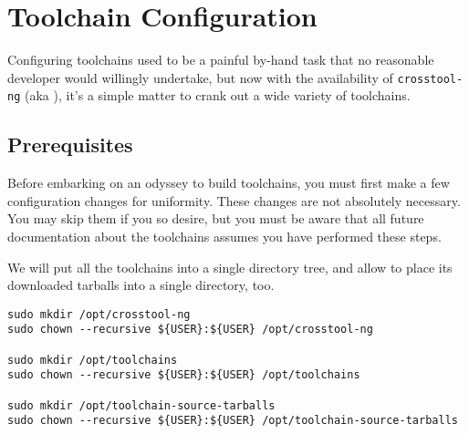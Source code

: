 %
%
%
%
\chapter{Toolchain Configuration}\label{chap:toolchain-configuration}

Configuring toolchains used to be a painful by-hand task that no
reasonable developer would willingly undertake, but now with the
availability of \texttt{crosstool-ng} (aka \ctng), it's a simple matter
to crank out a wide variety of toolchains.

\section{Prerequisites}

Before embarking on an odyssey to build toolchains, you must first
make a few configuration changes for uniformity.  These changes are
not absolutely necessary.  You may skip them if you so desire, but you
must be aware that all future documentation about the toolchains
assumes you have performed these steps.

We will put all the toolchains into a single directory tree, and
allow \ctng to place its downloaded tarballs into a single
directory, too.

\begin{footnotesize}
\begin{verbatim}
sudo mkdir /opt/crosstool-ng
sudo chown --recursive ${USER}:${USER} /opt/crosstool-ng

sudo mkdir /opt/toolchains
sudo chown --recursive ${USER}:${USER} /opt/toolchains

sudo mkdir /opt/toolchain-source-tarballs
sudo chown --recursive ${USER}:${USER} /opt/toolchain-source-tarballs
\end{verbatim}
\end{footnotesize}

